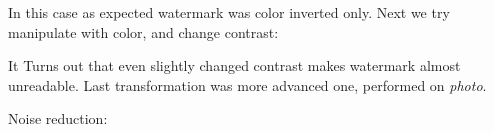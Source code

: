 \documentclass[a4paper, 12pt]{article}
\begin{document}
    	In this case as expected watermark was color inverted only. Next we try manipulate with color, and change contrast:

 		\begin{figure}[!h]%
			\centering
			\qquad
			\label{}%
		\end{figure}


    	It Turns out that even slightly changed contrast makes watermark almost unreadable. Last transformation was more advanced one, performed on \textit{photo}.

    	Noise reduction:

 		\begin{figure}[!h]%
			\centering
			\qquad
			\label{}%
		\end{figure}
\end{document}
